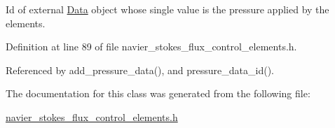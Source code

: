 Id of external \hyperlink{classoomph_1_1Data}{Data} object whose single value is the pressure applied by the elements. 



Definition at line 89 of file navier\+\_\+stokes\+\_\+flux\+\_\+control\+\_\+elements.\+h.



Referenced by add\+\_\+pressure\+\_\+data(), and pressure\+\_\+data\+\_\+id().



The documentation for this class was generated from the following file\+:\begin{DoxyCompactItemize}
\item 
\hyperlink{navier__stokes__flux__control__elements_8h}{navier\+\_\+stokes\+\_\+flux\+\_\+control\+\_\+elements.\+h}\end{DoxyCompactItemize}
